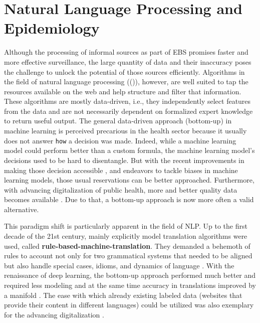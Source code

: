 \section{Natural Language Processing and Epidemiology}
Although the processing of informal sources as part of EBS promises faster and more effective surveillance, the large quantity of data and their inaccuracy poses the challenge to unlock the potential of those sources efficiently.
Algorithms in the field of natural language processing (()), however, are well suited to tap the resources available on the web and help structure and filter that information.
These algorithms are mostly data-driven, i.e., they independently select features from the data and are not necessarily dependent on formalized expert knowledge to return useful output.
The general data-driven approach (bottom-up) in machine learning is perceived precarious in the health sector because it usually does not answer \texttt{how} a decision was made.
Indeed, while a machine learning model could perform better than a custom formula, the machine learning model's decisions used to be hard to disentangle.
But with the recent improvements in making those decision accessible \citep{Arras2017}, and endeavors to tackle biases in machine learning models, those usual reservations can be better approached.
Furthermore, with advancing digitalization of public health, more and better quality data becomes available \citep{DEMIS}.
Due to that, a bottom-up approach is now more often a valid alternative.

This paradigm shift is particularly apparent in the field of NLP.
Up to the first decade of the 21st century, mainly explicitly model translation algorithms were used, called \textbf{rule-based-machine-translation}.
They demanded a behemoth of rules to account not only for two grammatical systems that needed to be aligned but also handle special cases, idioms, and dynamics of language \citep{Bar-Hillel1953, Bar-Hillel1960}.
With the renaissance of deep learning, the bottom-up approach performed much better and required less modeling and at the same time accuracy in translations improved by a manifold \citep{Bengio2003}.
The ease with which already existing labeled data (websites that provide their content in different languages) could be utilized was also exemplary for the advancing digitalization \citep{Macklovitch00}.

